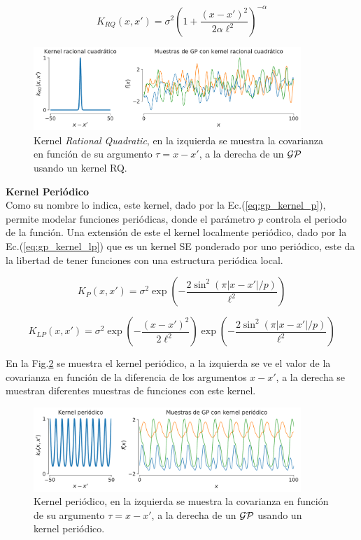 \begin{equation}\label{eq:gp_kernel_rq}
	K_{RQ}(x, x') = \sigma^2 \left(1 + \frac{\left( x- x'\right)^2}{2\alpha\ell^2 } \right)^{-\alpha}
\end{equation}


\begin{figure}[H]
	\centering
	\includegraphics[width=0.9\textwidth]{img/cap6_gp_muestras_RQ}
	\caption{Kernel \textit{Rational Quadratic}, en la izquierda se muestra la covarianza en función de su argumento $\tau=x-x'$, a la derecha de un $\mathcal{GP}$ usando un kernel RQ.}
	\label{fig:gp_6}
\end{figure}

\textbf{Kernel Periódico}\\

Como su nombre lo indica, este kernel, dado por la Ec.(\ref{eq:gp_kernel_p}), permite modelar funciones periódicas, donde el parámetro $p$ controla el periodo de la función. Una extensión de este el kernel localmente periódico, dado por la Ec.(\ref{eq:gp_kernel_lp}) que es un kernel SE ponderado por uno periódico, este da la libertad de tener funciones con una estructura periódica local.


\begin{equation}\label{eq:gp_kernel_p}
	K_{P}(x, x') = \sigma^2 \exp\left(-\frac{2\sin^2\left(\pi |x- x'| / p \right)}{\ell^2 } \right)
\end{equation}

\begin{equation}\label{eq:gp_kernel_lp}
	K_{LP}(x, x') = \sigma^2  \exp\left(-\frac{\left(x- x' \right)^2}{2\ell^2 } \right) \exp\left(-\frac{2\sin^2\left(\pi |x- x'| / p \right)}{\ell^2 } \right)
\end{equation}

En la Fig.\ref{fig:gp_7} se muestra el kernel periódico, a la izquierda se ve el valor de la covarianza en función de la diferencia de los argumentos $x-x'$, a la derecha se muestran diferentes muestras de funciones con este kernel.

\begin{figure}[H]
	\centering
	\includegraphics[width=0.9\textwidth]{img/cap6_gp_muestras_P.pdf}
	\caption{Kernel periódico, en la izquierda se muestra la covarianza en función de su argumento $\tau=x-x'$, a la derecha de un $\mathcal{GP}$ usando un kernel periódico.}
	\label{fig:gp_7}
\end{figure}

